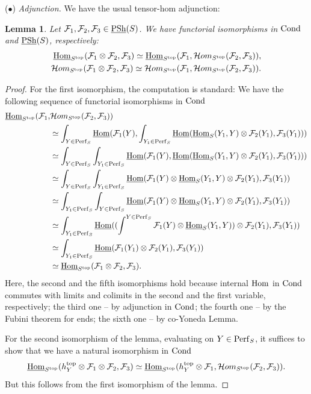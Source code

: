 \documentclass[10pt]{amsart}
\let\cal\mathcal
\newtheorem{lemma}[equation]{Lemma}
\theoremstyle{definition}
\theoremstyle{remark}
\newcommand{\Hom}{{\rm{Hom}} }
\newcommand{\uHom}{\underline{{\rm{Hom}} }}
\newcommand{\Hhom}{{\cal Hom}}
\newcommand{\sff}{{\mathcal{F}}}
\numberwithin{equation}{section}
\numberwithin{equation}{section}
\begin{document}
\vskip2mm
 ($\bullet$) {\em Adjunction.}   We have the usual tensor-hom adjunction: 
\begin{lemma} \label{adjoint1} Let $\sff_1,\sff_2,\sff_3\in \underline{\rm PSh}(S)$. We have  functorial isomorphisms in ${\rm Cond}$ and $\underline{\rm PSh}(S)$, respectively:
\begin{align*}
\uHom_{S^{\rm top}} (\sff_1\otimes\sff_2,\sff_3)\simeq \uHom_{S^{\rm top}}(\sff_1,\Hhom_{S^{\rm top}}(\sff_2,\sff_3)),\\
\Hhom_{S^{\rm top}} (\sff_1\otimes\sff_2,\sff_3)\simeq \Hhom_{S^{\rm top}}(\sff_1,\Hhom_{S^{\rm top}}(\sff_2,\sff_3)).
\end{align*}
\end{lemma}
\begin{proof} For the first isomorphism, the computation is standard: We have the following sequence of functorial isomorphisms in ${\rm Cond}$
\begin{align*}
\uHom_{S^{\rm top}}(\sff_1, & \Hhom_{S^{\rm top}}(\sff_2,\sff_3))\\
 & \simeq \int_{Y\in {\rm Perf}_S}\uHom(\sff_1(Y), \int_{Y_1\in {\rm Perf}_S} \uHom(\uHom_S(Y_1,Y)\otimes \sff_2(Y_1),\sff_3(Y_1)))\\
  & \simeq \int_{Y\in {\rm Perf}_S}\int_{Y_1\in {\rm Perf}_S}\uHom(\sff_1(Y),  \uHom(\uHom_S(Y_1,Y)\otimes \sff_2(Y_1),\sff_3(Y_1)))\\
  & \simeq \int_{Y\in {\rm Perf}_S}\int_{Y_1\in {\rm Perf}_S}\uHom(\sff_1(Y)\otimes \uHom_S(Y_1,Y)\otimes \sff_2(Y_1),\sff_3(Y_1))\\
    & \simeq \int_{Y_1\in {\rm Perf}_S}\int_{Y\in {\rm Perf}_S}\uHom(\sff_1(Y)\otimes \uHom_S(Y_1,Y)\otimes \sff_2(Y_1),\sff_3(Y_1))\\
      & \simeq \int_{Y_1\in {\rm Perf}_S}\uHom((\int^{Y\in {\rm Perf}_S}\sff_1(Y)\otimes \uHom_S(Y_1,Y))\otimes \sff_2(Y_1),\sff_3(Y_1))\\
       & \simeq \int_{Y_1\in {\rm Perf}_S}\uHom(\sff_1(Y_1)\otimes \sff_2(Y_1),\sff_3(Y_1))\\
        & \simeq \uHom_{S^{\rm top}}(\sff_1\otimes \sff_2,\sff_3).
\end{align*}
Here, the second and the  fifth isomorphisms hold because internal $\Hom$ in ${\rm Cond}$ commutes with limits and colimits in the second and the first variable, respectively; the  third one -- by adjunction in ${\rm Cond}$; the fourth one --  by  the Fubini theorem for ends; the sixth one  -- by co-Yoneda Lemma.

 For the second isomorphism of the lemma, evaluating on $Y\in {\rm Perf}_S$, it suffices to show that we have a natural isomorphism in ${\rm Cond}$ 
$$
\uHom_{S^{\rm top}} (h^{\rm top}_Y\otimes \sff_1\otimes\sff_2,\sff_3)\simeq \uHom_{S^{\rm top}}(h^{\rm top}_Y\otimes\sff_1,\Hhom_{S^{\rm top}}(\sff_2,\sff_3)).
$$
But this follows from the first isomorphism of the lemma.
\end{proof}
\end{document}
